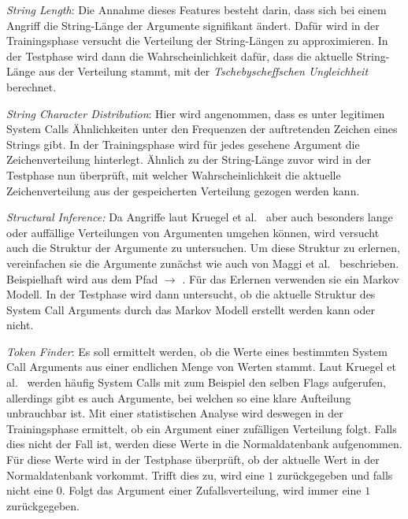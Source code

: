             \begin{description}
                \item \textit{String Length}: Die Annahme dieses Features besteht darin, dass sich bei einem Angriff die String-Länge der Argumente signifikant ändert.
                Dafür wird in der Trainingsphase versucht die Verteilung der String-Längen zu approximieren.
                In der Testphase wird dann die Wahrscheinlichkeit dafür, dass die aktuelle String-Länge aus der Verteilung stammt, mit der \textit{Tschebyscheffschen Ungleichheit} berechnet.
                
                \item \textit{String Character Distribution}: Hier wird angenommen, dass es unter legitimen System Calls Ähnlichkeiten unter den Frequenzen der auftretenden Zeichen eines Strings gibt.
                In der Trainingsphase wird für jedes gesehene Argument die Zeichenverteilung hinterlegt.
                Ähnlich zu der String-Länge zuvor wird in der Testphase nun überprüft, mit welcher Wahrscheinlichkeit die aktuelle Zeichenverteilung aus der gespeicherten Verteilung gezogen werden kann.

                \item \textit{Structural Inference:} Da Angriffe laut Kruegel et al.~\cite{ARGUMENTS} aber auch besonders lange oder auffällige Verteilungen von Argumenten umgehen können, wird versucht auch die Struktur der Argumente zu untersuchen.
                Um diese Struktur zu erlernen, vereinfachen sie die Argumente zunächst wie auch von Maggi et al.~\cite{ARGUMENTS2} beschrieben.
                Beispielhaft wird aus dem Pfad  $\longrightarrow$ .
                Für das Erlernen verwenden sie ein Markov Modell.
                In der Testphase wird dann untersucht, ob die aktuelle Struktur des System Call Arguments durch das Markov Modell erstellt werden kann oder nicht.

                \item \textit{Token Finder}: Es soll ermittelt werden, ob die Werte eines bestimmten System Call Arguments aus einer endlichen Menge von Werten stammt.
                Laut Kruegel et al.~\cite{ARGUMENTS} werden häufig System Calls mit zum Beispiel den selben Flags aufgerufen, allerdings gibt es auch Argumente, bei welchen so eine klare Aufteilung unbrauchbar ist.
                Mit einer statistischen Analyse wird deswegen in der Trainingsphase ermittelt, ob ein Argument einer zufälligen Verteilung folgt.
                Falls dies nicht der Fall ist, werden diese Werte in die Normaldatenbank aufgenommen.
                Für diese Werte wird in der Testphase überprüft, ob der aktuelle Wert in der Normaldatenbank vorkommt.
                Trifft dies zu, wird eine $1$ zurückgegeben und falls nicht eine $0$.
                Folgt das Argument einer Zufallsverteilung, wird immer eine $1$ zurückgegeben.
            \end{description}

